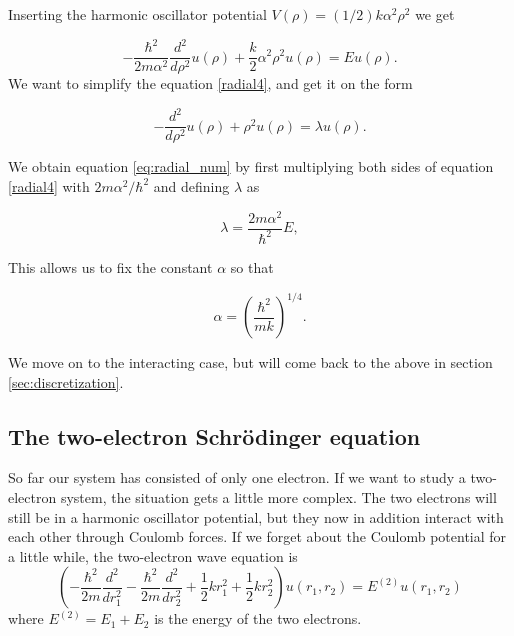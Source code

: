 \documentclass[12pt]{article}
\numberwithin{figure}{section}
\numberwithin{table}{section}
\begin{document}
\noindent Inserting the harmonic oscillator potential $V(\rho) = (1/2) k \alpha^2\rho^2$ we get \cite{pro2}

\begin{equation}
\label{radial4}
  -\frac{\hbar^2}{2 m \alpha^2} \frac{d^2}{d\rho^2} u(\rho) 
       + \frac{k}{2} \alpha^2\rho^2u(\rho)  = E u(\rho) .
\end{equation}
\noindent We want to simplify the equation \eqref{radial4}, and get it on the form \cite{pro2}

\begin{equation}
\label{eq:radial_num}
  -\frac{d^2}{d\rho^2} u(\rho) + \rho^2u(\rho)  = \lambda u(\rho) .
\end{equation}

\noindent We obtain equation \eqref{eq:radial_num} by first multiplying both sides of equation \eqref{radial4} with $2m\alpha^2/\hbar^2$ and defining $\lambda$ as \cite{pro2}

\begin{equation}
\lambda = \frac{2m\alpha^2}{\hbar^2}E,
\end{equation}


\noindent This allows us to fix the constant $\alpha$ so that \cite{pro2}

\begin{equation}
\alpha = \left(\frac{\hbar^2}{mk}\right)^{1/4}.
\end{equation}

\noindent We move on to the interacting case, but will come back to the above in section \ref{sec:discretization}.


\subsection{The two-electron Schrödinger equation}
So far our system has consisted of only one electron. If we want to study a two-electron system, the situation gets a little more complex. The two electrons will still be in a harmonic oscillator potential, but they now in addition interact with each other through Coulomb forces. If we forget about the Coulomb potential for a little while, the two-electron wave equation is \cite{Comp}
\begin{equation}
\label{two:schrodinger}
\left(-\frac{\hbar^2}{2m}\frac{d^2}{dr^2_1}-\frac{\hbar^2}{2m}\frac{d^2}{dr^2_2}+\frac{1}{2}kr^2_1+\frac{1}{2}kr^2_2\right)u(r_1,r_2)=E^{(2)}u(r_1,r_2)
\end{equation}
where $E^{(2)}=E_1+E_2$ is the energy of the two electrons. \\
\end{document}
